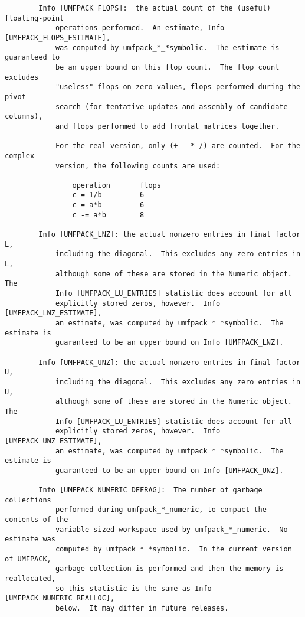 {\begin{verbatim}
        Info [UMFPACK_FLOPS]:  the actual count of the (useful) floating-point
            operations performed.  An estimate, Info [UMFPACK_FLOPS_ESTIMATE],
            was computed by umfpack_*_*symbolic.  The estimate is guaranteed to
            be an upper bound on this flop count.  The flop count excludes
            "useless" flops on zero values, flops performed during the pivot
            search (for tentative updates and assembly of candidate columns),
            and flops performed to add frontal matrices together.

            For the real version, only (+ - * /) are counted.  For the complex
            version, the following counts are used:

                operation       flops
                c = 1/b         6
                c = a*b         6
                c -= a*b        8

        Info [UMFPACK_LNZ]: the actual nonzero entries in final factor L,
            including the diagonal.  This excludes any zero entries in L,
            although some of these are stored in the Numeric object.  The
            Info [UMFPACK_LU_ENTRIES] statistic does account for all
            explicitly stored zeros, however.  Info [UMFPACK_LNZ_ESTIMATE],
            an estimate, was computed by umfpack_*_*symbolic.  The estimate is
            guaranteed to be an upper bound on Info [UMFPACK_LNZ].

        Info [UMFPACK_UNZ]: the actual nonzero entries in final factor U,
            including the diagonal.  This excludes any zero entries in U,
            although some of these are stored in the Numeric object.  The
            Info [UMFPACK_LU_ENTRIES] statistic does account for all
            explicitly stored zeros, however.  Info [UMFPACK_UNZ_ESTIMATE],
            an estimate, was computed by umfpack_*_*symbolic.  The estimate is
            guaranteed to be an upper bound on Info [UMFPACK_UNZ].

        Info [UMFPACK_NUMERIC_DEFRAG]:  The number of garbage collections
            performed during umfpack_*_numeric, to compact the contents of the
            variable-sized workspace used by umfpack_*_numeric.  No estimate was
            computed by umfpack_*_*symbolic.  In the current version of UMFPACK,
            garbage collection is performed and then the memory is reallocated,
            so this statistic is the same as Info [UMFPACK_NUMERIC_REALLOC],
            below.  It may differ in future releases.


\end{verbatim}}

